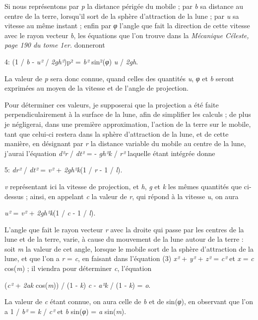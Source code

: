 \documentclass[a4paper, 11pt, oneside, polutonikogreek, french]{article}
\begin{document}
Si nous représentons par \emph{p} la distance périgée du mobile ; par \emph{b} sa distance au centre de la terre, lorsqu'il sort de la sphère d'attraction de la lune ; par \emph{u} sa vitesse au même instant ; enfin par \emph{φ} l'angle que fait la direction de cette vitesse avec le rayon vecteur \emph{b}, les équations que l'on trouve dans la \emph{Mécanique Céleste, page 190 du tome 1er.} donneront

4: (1 / \emph{b} - \emph{u²} / \emph{2gh²})p² = \emph{b²} sin²(\emph{φ}) \emph{u} / \emph{2gh}.

La valeur de \emph{p} sera donc connue, quand celles des quantités \emph{u}, \emph{φ} et \emph{b} seront exprimées au moyen de la vitesse et de l'angle de projection.

Pour déterminer ces valeurs, je supposerai que la projection a été faite perpendiculairement à la surface de la lune, afin de simplifier les calculs ; de plus je négligerai, dans une première approximation, l'action de la terre sur le mobile, tant que celui-ci restera dans la sphère d'attraction de la lune, et de cette manière, en désignant par \emph{r} la distance variable du mobile au centre de la lune, j'aurai l'équation \emph{d²r} / \emph{dt²} = - \emph{gh²k} / \emph{r²} laquelle étant intégrée donne

5: \emph{dr²} / \emph{dt²} = \emph{v²} + \emph{2gh²k}(1 / \emph{r} - 1 / \emph{l}).

\emph{v} représentant ici la vitesse de projection, et \emph{h}, \emph{g} et \emph{k} les mêmes quantités que ci-dessus ; ainsi, en appelant \emph{c} la valeur de \emph{r}, qui répond à la vitesse \emph{u}, on aura

\emph{u²} = \emph{v²} + \emph{2gh²k}(1 / \emph{c} - 1 / \emph{l}).

L'angle que fait le rayon vecteur \emph{r} avec la droite qui passe par les centres de la lune et de la terre, varie, à cause du mouvement de la lune autour de la terre : soit \emph{m} la valeur de cet angle, lorsque le mobile sort de la sphère d'attraction de la lune, et que l'on a \emph{r} = \emph{c}, en faisant dans l'équation (3) \emph{x²} + \emph{y²} + \emph{z²} = \emph{c²} et \emph{x} = \emph{c} cos(\emph{m}) ; il viendra pour déterminer \emph{c}, l'équation

(\emph{c²} + \emph{2ak} cos(\emph{m})) / (1 - \emph{k}) \emph{c} - \emph{a²k} / (1 - \emph{k}) = \emph{o}.

La valeur de \emph{c} étant connue, on aura celle de \emph{b} et de sin(\emph{φ}), en observant que l'on a 1 / \emph{b²} = \emph{k} / \emph{c²} et \emph{b} sin(\emph{φ}) = \emph{a} sin(\emph{m}).
\end{document}
